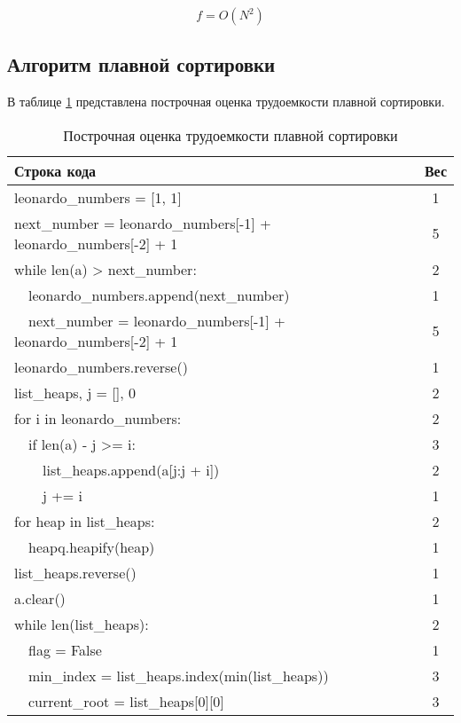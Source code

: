 \begin{equation}
	f = O(N^2)
\end{equation}


\subsection{Алгоритм плавной сортировки}

В таблице \ref{tbl:smooth_weight} представлена построчная оценка трудоемкости плавной сортировки.
\begin{table}[H]
	\begin{center}
		\begin{threeparttable}
			\captionsetup{}
			\caption{\label{tbl:smooth_weight}Построчная оценка трудоемкости плавной сортировки}
			\begin{tabular}{|l|c|}
				\hline
				Строка кода & Вес \\
				\hline
				leonardo\_numbers = [1, 1] & 1\\
				\hline
				next\_number = leonardo\_numbers[-1] + leonardo\_numbers[-2] + 1 & 5\\
				\hline
				while len(a) > next\_number: & 2\\
				\hline
				~~leonardo\_numbers.append(next\_number) & 1\\
				\hline
				~~next\_number = leonardo\_numbers[-1] + leonardo\_numbers[-2] + 1 & 5\\
				\hline
				leonardo\_numbers.reverse() & 1\\
				\hline
				list\_heaps, j = [], 0 & 2\\
				\hline
				for i in leonardo\_numbers: & 2\\
				\hline
				~~if len(a) - j >= i: & 3\\
				\hline
				~~~~list\_heaps.append(a[j:j + i]) & 2\\
				\hline
				~~~~j += i & 1\\
				\hline
				for heap in list\_heaps: & 2\\
				\hline
				~~heapq.heapify(heap) & 1\\
				\hline
				list\_heaps.reverse() & 1\\
				\hline
				a.clear() & 1\\
				\hline
				while len(list\_heaps): & 2\\
				\hline
				~~flag = False & 1\\
				\hline
				~~min\_index = list\_heaps.index(min(list\_heaps)) & 3\\
				\hline
				~~current\_root = list\_heaps[0][0] & 3\\

\end{tabular}
\end{threeparttable}
\end{center}
\end{table}
